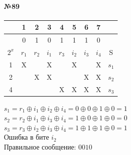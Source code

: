 \documentclass[12pt,onecolumn]{article}
\begin{document}
\begin{flushleft}
\paragraph{№89}
\hfill \break
\FloatBarrier
\begin{table}[h!]
  \begin{tabular}{|c|c|c|c|c|c|c|c|c|}

  \hline
                       & 1                         & 2                         & 3                         & 4                         & 5                         & 6                         & 7                         &      \\ \hline
                       & 0                         & 1                         & 0                         & 1                         & 1                         & 1                         & 0                         &      \\ \hline
  $2^x$ & $r_1$                             & $r_2$                      & $i_1$                      & $r_3$                     & $i_2$                      & $i_3$                      & $i_4$                      & S    \\ \hline
  1                    & \cellcolor[HTML]{32CB00}X &                           & \cellcolor[HTML]{32CB00}X &                           & \cellcolor[HTML]{32CB00}X &                           & \cellcolor[HTML]{32CB00}X & $s_1$ \\ \hline
  2                    &                           & \cellcolor[HTML]{34CDF9}X & \cellcolor[HTML]{34CDF9}X &                           &                           & \cellcolor[HTML]{34CDF9}X & \cellcolor[HTML]{34CDF9}X & $s_2$ \\ \hline
  4                    &                           &                           &                           & \cellcolor[HTML]{FFCC67}X & \cellcolor[HTML]{FFCC67}X & \cellcolor[HTML]{FFCC67}X & \cellcolor[HTML]{FFCC67}X & $s_3$ \\ \hline
  \end{tabular}
\end{table}
$s_1 = r_1\oplus i_1 \oplus i_2 \oplus i_4 = 0 \oplus 0 \oplus 1 \oplus 0 = 1 $\\
$s_2 = r_2\oplus i_1 \oplus i_3 \oplus i_4 = 1 \oplus 0 \oplus 1 \oplus 0 = 0 $\\
$s_3 = r_3\oplus i_2 \oplus i_3 \oplus i_4 = 1 \oplus 1 \oplus 1 \oplus 0 = 1 $\\
Ошибка в бите $i_2$\\
Правильное сообщение: $0010$

\end{flushleft}
\end{document}
